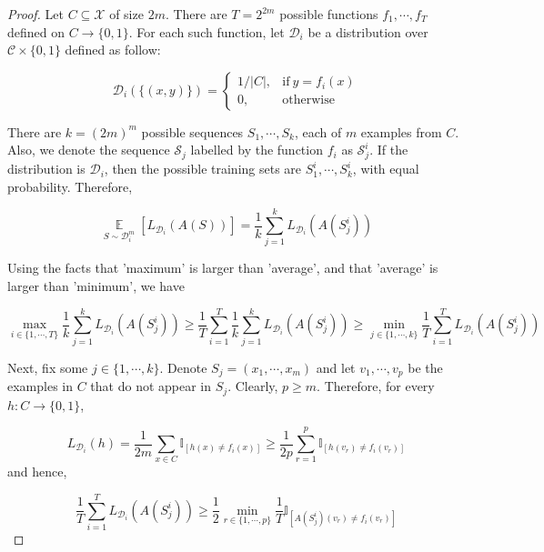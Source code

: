 \documentclass{article}
\newtheorem*{proof}{Proof}
\begin{document}
	\begin{proof}
	Let $C\subseteq\mathcal{X}$ of size $2m$. There are $T=2^{2m}$ possible functions $f_1,\cdots,f_T$ defined on $C\rightarrow\{0,1\}$. For each such function, let $\mathcal{D}_i$ be a distribution over $\mathcal{C}\times\{0,1\}$ defined as follow:
	
	\begin{equation*}
	\mathcal{D}_i(\{(x,y)\})=\left\{
	\begin{matrix} 1/|C|,& \mathrm{if}\ y=f_i(x) \\ 0,& \mathrm{otherwise} 
	\end{matrix}\right.
	\end{equation*}
	
	There are $k=(2m)^m$ possible sequences $S_1,\cdots,S_k$, each of $m$ examples from $C$. Also, we denote the sequence $\mathcal{S}_j$ labelled by the function $f_i$ as $\mathcal{S}_j^i$. If the distribution is $\mathcal{D}_i$, then the possible training sets are $S_1^i,\cdots,S_k^i$, with equal probability. Therefore,

	\begin{equation*}
	\mathop{\mathbb{E}}\limits_{S\sim\mathcal{D}_i^m}[L_{\mathcal{D}_i}(A(S))]=\frac{1}{k}\sum_{j=1}^kL_{\mathcal{D}_i}(A(S_j^i))
	\end{equation*}
	
	Using the facts that 'maximum' is larger than 'average', and that 'average' is larger than 'minimum', we have
	
	\begin{equation*}
	\max_{i\in\{1,\cdots,T\}} \frac{1}{k}\sum_{j=1}^k L_{\mathcal{D}_i}(A(S_j^i)) \geq \frac{1}{T}\sum_{i=1}^T \frac{1}{k} \sum_{j=1}^k L_{\mathcal{D}_i}(A(S_j^i)) \geq \min_{j\in\{1,\cdots,k\}}\frac{1}{T}\sum_{i=1}^T L_{\mathcal{D}_i} (A(S_j^i))
	\end{equation*}

	Next, fix some $j\in\{1,\cdots,k\}$. Denote $S_j=(x_1,\cdots,x_m)$ and let $v_1,\cdots,v_p$ be the examples in $C$ that do not appear in $S_j$. Clearly, $p\geq m$. Therefore, for every $h:C\rightarrow\{0,1\}$,
	
	\begin{equation*}
	L_{\mathcal{D}_i}(h)=\frac{1}{2m}\sum_{x\in C}\mathbb{I}_{[h(x)\neq f_i(x)]}\geq\frac{1}{2p}\sum_{r=1}^p\mathbb{I}_{[h(v_r)\neq f_i(v_r)]}
	\end{equation*}
and hence,

	\begin{equation*}
	\frac{1}{T}\sum_{i=1}^T L_{\mathcal{D}_i} (A(S_j^i))\geq\frac{1}{2}\min_{r\in\{1,\cdots,p\}}\frac{1}{T}\mathbb{I}_{[A(S^i_j)(v_r)\neq f_i(v_r)]}
	\end{equation*}


\end{proof}
\end{document}
